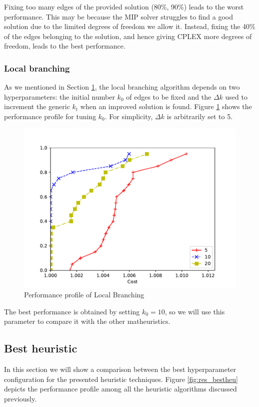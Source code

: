 \documentclass{article}
\begin{document}
Fixing too many edges of the provided solution (80\%, 90\%) leads to the worst performance. This may be because
the MIP solver struggles to find a good solution due to the limited degrees of
freedom we allow it. Instead, fixing the 40\% of the edges belonging to the solution, and hence giving
CPLEX more degrees of freedom, leads to the best performance.

\clearpage
\subsubsection{Local branching}
As we mentioned in Section \ref{fig:ht_localb}, the local branching algorithm depends on two hyperparameters:
the initial number $k_0$ of edges to be fixed and the $\Delta k$ used to increment the generic
$k_t$ when an improved solution is found.
Figure \ref{fig:ht_localb} shows the performance profile for tuning $k_0$.
For simplicity, $\Delta k$ is arbitrarily set to 5.

\begin{figure}[ht]
        \caption{Performance profile of Local Branching}
        \label{fig:ht_localb}
        \centering
        \includegraphics[width=340pt]{assets/ht_localb.pdf}
\end{figure}

The best performance is obtained by setting $k_0 = 10$, so we will use this parameter
to compare it with the other matheuristics.

\clearpage
\newpage
\subsection{Best heuristic}

In this section we will show a comparison between the best hyperparameter
configuration for the presented heuristic techniques.
Figure \ref{fig:res_bestheu} depicts the performance profile among
all the heuristic algorithms discussed previously.
\end{document}
